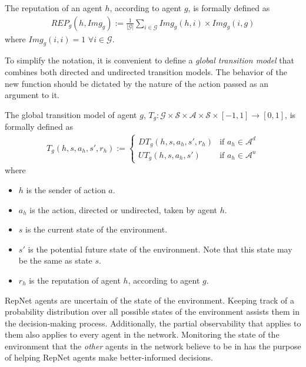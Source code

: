 \begin{definition}[Reputation]
\label{def:reppo}
The reputation of an agent $h$, according to agent $g$, is formally defined as 
\begin{align*}
     REP_g(h, Img_g) := \frac{1}{|\mathcal{G}|} \sum_{i \in \mathcal{G}} Img_g(h,i) \times Img_g(i,g)
\end{align*}
where $Img_g(i,i) = 1 \,\,\forall i \in \mathcal{G}$.
\end{definition}

To simplify the notation, it is convenient to define a \textit{global transition model} that combines both directed and undirected transition models. The behavior of the new function should be dictated by the nature of the action passed as an argument to it.

\begin{definition}
\label{def:globtran}
The global transition model of agent $g$, $T_g : \mathcal{G} \times \mathcal{S} \times \mathcal{A} \times \mathcal{S} \times [-1,1] \rightarrow [0,1]$, is formally defined as
\begin{align*}
     T_g(h, s,a_h,s', r_h) := 
    \begin{cases}
    DT_g(h, s,a_h,s', r_h) & \mbox{if } a_h \in \mathcal{A}^d
    \\
    UT_g(h,s,a_h,s') & \mbox{if } a_h \in \mathcal{A}^u
    \end{cases}
\end{align*}
where 
\begin{itemize}
    \item $h$ is the sender of action $a$.
    \item $a_h$ is the action, directed or undirected, taken by agent $h$.
    \item $s$ is the current state of the environment.
    \item $s'$ is the potential future state of the environment. Note that this state may be the same as state $s$.
    \item $r_h$ is the reputation of agent $h$, according to agent $g$.
\end{itemize}
\end{definition}

RepNet agents are uncertain of the state of the environment. Keeping track of a probability distribution over all possible states of the environment assists them in the decision-making process. Additionally, the partial observability that applies to them also applies to every agent in the network. Monitoring the state of the environment that the \textit{other} agents in the network believe to be in has the purpose of helping RepNet agents make better-informed decisions.

